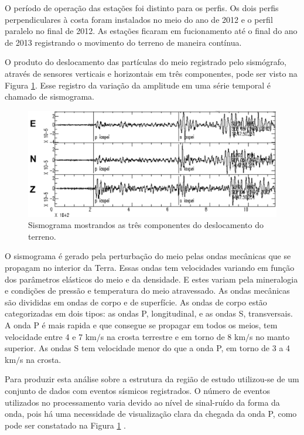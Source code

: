 O período de operação das estações foi distinto para os perfis. Os dois perfis perpendiculares à costa foram instalados no meio do ano de 2012 e o perfil paralelo no final de 2012. As estações ficaram em fucionamento até o final do ano de 2013 registrando o movimento do terreno de maneira contínua. 

O produto do deslocamento das partículas do meio registrado pelo sismógrafo, através de sensores verticais e horizontais em três componentes, pode ser visto na Figura \ref{simograma}. Esse registro da variação da amplitude em uma série temporal é chamado de sismograma. 

\begin{figure}[!ht]
\centering
\includegraphics[scale=0.6]{sismograma.png}
\caption{Sismograma mostrandos as três componentes do deslocamento do terreno.}
\label{simograma}
\end{figure}

O sismograma é gerado pela perturbação do meio pelas ondas  mecânicas que se propagam no interior da Terra. Essas ondas  tem velocidades variando em função dos parâmetros elásticos do meio e da densidade. E estes variam pela mineralogia e condições de pressão e temperatura do meio atravessado. As ondas mecânicas são divididas em ondas de corpo e de superfície. As ondas de corpo estão categorizadas em dois tipos: as ondas P, longitudinal, e as ondas S, transversais. A onda P é mais rapida e que consegue se propagar em todos os meios, tem velocidade entre 4 e 7 km$/$s na crosta terrestre e em torno de 8 km$/$s no manto superior. As ondas S tem velocidade menor do que a onda P, em torno de 3 a 4 km$/$s na crosta.

Para produzir esta análise sobre a estrutura da região de estudo utilizou-se de um conjunto de dados com eventos sísmicos registrados. O número de eventos utilizados no processamento varia devido ao nível de sinal-ruído da forma da onda, pois há uma necessidade de visualização clara da chegada da onda P, como pode ser constatado na Figura \ref{simograma} .

